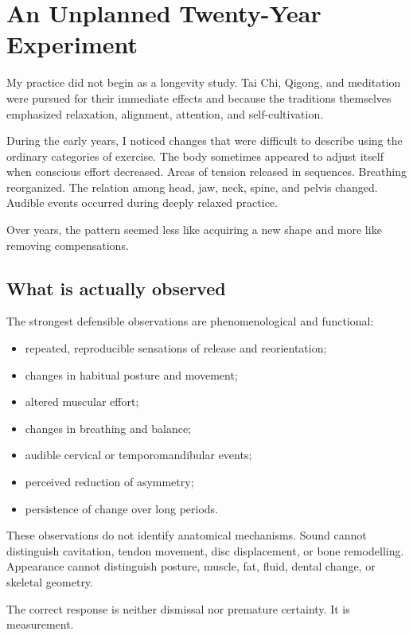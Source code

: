 \chapter{An Unplanned Twenty-Year Experiment}

My practice did not begin as a longevity study. Tai Chi, Qigong, and meditation were pursued for their immediate effects and because the traditions themselves emphasized relaxation, alignment, attention, and self-cultivation.

During the early years, I noticed changes that were difficult to describe using the ordinary categories of exercise. The body sometimes appeared to adjust itself when conscious effort decreased. Areas of tension released in sequences. Breathing reorganized. The relation among head, jaw, neck, spine, and pelvis changed. Audible events occurred during deeply relaxed practice.

Over years, the pattern seemed less like acquiring a new shape and more like removing compensations.

\section{What is actually observed}

The strongest defensible observations are phenomenological and functional:

\begin{itemize}
\tightlist
\item
  repeated, reproducible sensations of release and reorientation;
\item
  changes in habitual posture and movement;
\item
  altered muscular effort;
\item
  changes in breathing and balance;
\item
  audible cervical or temporomandibular events;
\item
  perceived reduction of asymmetry;
\item
  persistence of change over long periods.
\end{itemize}

These observations do not identify anatomical mechanisms. Sound cannot distinguish cavitation, tendon movement, disc displacement, or bone remodelling. Appearance cannot distinguish posture, muscle, fat, fluid, dental change, or skeletal geometry.

The correct response is neither dismissal nor premature certainty. It is measurement.


